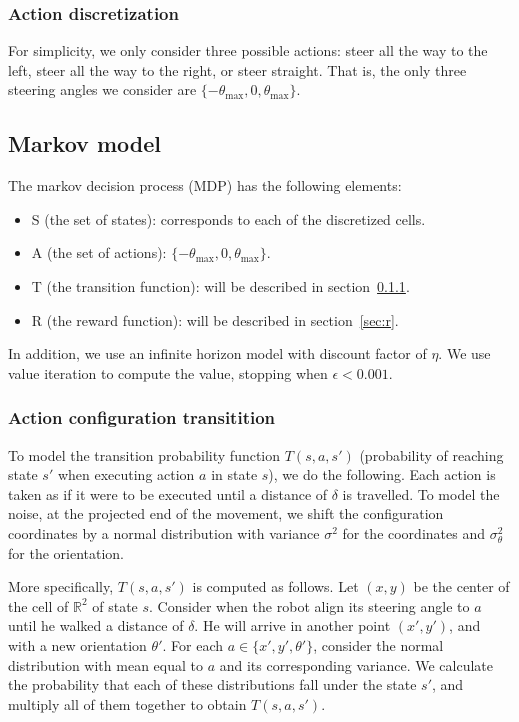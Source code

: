 \documentclass[a4paper]{article}
\begin{document}
\subsubsection{Action discretization}
For simplicity, we only consider three possible actions: steer all the way
to the left, steer all the way to the right, or steer straight. That is,
the only three steering angles we consider are $\{-\theta_\text{max}, 0, \theta_\text{max}\}$.

\subsection{Markov model}
The markov decision process (MDP) has the following elements:
\begin{itemize}
  \item S (the set of states): corresponds to each of the discretized cells.
  \item A (the set of actions): $\{-\theta_\text{max}, 0, \theta_\text{max}\}$.
  \item T (the transition function): will be described in section~\ref{sec:t}.
  \item R (the reward function): will be described in section~\ref{sec:r}.
\end{itemize}

In addition, we use an infinite horizon model with discount factor of $\eta$.
We use value iteration to compute the value, stopping when $\epsilon < 0.001$.

\subsubsection{Action configuration transitition}
\label{sec:t}
To model the transition probability function $T(s, a, s')$ (probability of
reaching state $s'$ when executing action $a$ in state $s$), we do the following.
Each action is taken as if it were to be executed until a distance of $\delta$
is travelled. To model the noise, at the projected end of the movement, we
shift the configuration coordinates by a normal distribution with variance
$\sigma^2$ for the coordinates and $\sigma_\theta^2$ for the orientation.

More specifically, $T(s, a, s')$ is computed as follows. Let $(x, y)$ be the
center of the cell of $\mathbb{R}^2$ of state $s$. Consider when the robot
align its steering angle to $a$ until he walked a distance of $\delta$. He
will arrive in another point $(x', y')$, and with a new orientation $\theta'$.
For each $a \in \{x', y', \theta'\}$, consider the normal distribution
with mean equal to $a$ and its corresponding variance. We calculate the probability
that each of these distributions fall under the state $s'$, and multiply all
of them together to obtain $T(s, a, s')$.
\end{document}
